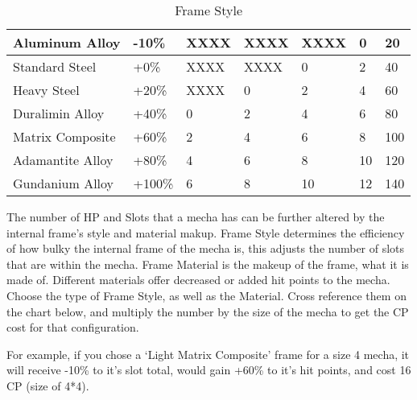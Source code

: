 \documentclass[twoside]{book}
\begin{document}
\begin{enumerate}
\begin{table}[htb]
\begin{center}
\begin{tabular}{|p{12em}|p{4em}|p{4em}|p{4em}|p{4em}|p{4em}|p{4em}|}
\hline

 Aluminum Alloy & -10\% & XXXX & XXXX & XXXX & 0 & 20 \\

\hline

 Standard Steel & +0\% & XXXX & XXXX & 0 & 2 & 40 \\

\hline

 Heavy Steel & +20\% & XXXX & 0 & 2 & 4 & 60 \\

\hline

 Duralimin Alloy & +40\% & 0 & 2 & 4 & 6 & 80 \\

\hline

 Matrix Composite & +60\% & 2 & 4 & 6 & 8 & 100 \\

\hline

 Adamantite Alloy & +80\% & 4 & 6 & 8 & 10 & 120 \\

\hline

 Gundanium Alloy & +100\% & 6 & 8 & 10 & 12 & 140 \\

\hline


  \end{tabular}
  
\caption{Frame Style}
  
  \end{center}
\end{table}
    
                  
    {  
     The number of HP and Slots that a mecha has can
                   be further altered by the internal frame's style
                   and material makup. Frame Style determines the
                   efficiency of how bulky the internal frame of the
                   mecha is, this adjusts the number of slots that are
                   within the mecha. Frame Material is the makeup of the
                   frame, what it is made of. Different materials offer
                   decreased or added hit points to the mecha. Choose the
                   type of Frame Style, as well as the Material. Cross
                   reference them on the chart below, and multiply the
                   number by the size of the mecha to get the CP cost for
                   that configuration. 
    }
  
                  
    {  
     For example, if you chose a `Light Matrix
                   Composite' frame for a size 4 mecha, it will
                   receive -10\% to it's slot total, would gain +60\%
                   to it's hit points, and cost 16 CP (size of
                   4*4). 
    }
  

\end{enumerate}
\end{document}
